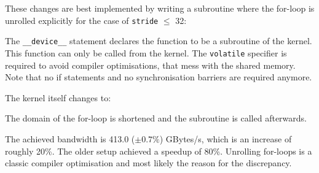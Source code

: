 These changes are best implemented by writing a subroutine where the for-loop is unrolled explicitly for the case of \texttt{stride} \(\le\) 32:

The \texttt{\_\_device\_\_} statement declares the function to be a subroutine of the kernel.
This function can only be called from the kernel.
The \texttt{volatile} specifier is required to avoid compiler optimisations, that mess with the shared memory.
Note that no if statements and no synchronisation barriers are required anymore.

The kernel itself changes to:

The domain of the for-loop is shortened and the subroutine is called afterwards.

The achieved bandwidth is 413.0 (\( \pm 0.7\% \)) GBytes/s, which is an increase of roughly 20\%.
The older setup achieved a speedup of 80\%.
Unrolling for-loops is a classic compiler optimisation and most likely the reason for the discrepancy.

